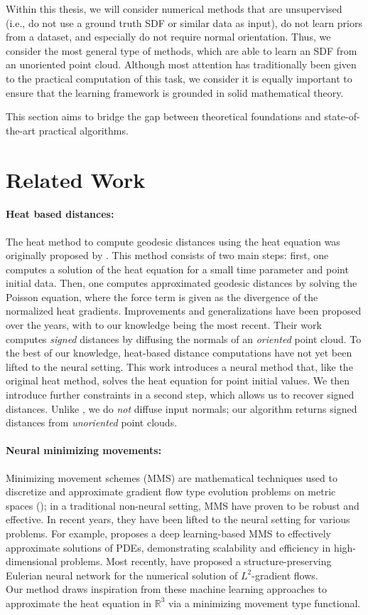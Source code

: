 \documentclass[12pt,openany]{book}
\newcommand{\R}{\mathbb{R}}
\theoremstyle{plainnormal}
\theoremstyle{remark}
\begin{document}
Within this thesis, we will consider numerical methods that are unsupervised (i.e., do not use a ground truth SDF or similar data as input), do not learn priors from a dataset, and especially do not require normal orientation. Thus, we consider the most general type of methods, which are able to learn an SDF from an unoriented point cloud. Although most attention has traditionally been given to the practical computation of this task, we consider it is equally important to ensure that the learning framework is grounded in solid mathematical theory. \par
This section aims to bridge the gap between theoretical foundations and state-of-the-art practical algorithms.
\section{Related Work} \label{SDF_rel_work}
\paragraph{Heat based distances:}
The heat method to compute geodesic distances using the heat equation was originally proposed by \cite{Crane_2013, Crane:2017:HMD}. This method consists of two main steps: first, one computes a solution of the heat equation for a small time parameter and point initial data. Then, one computes approximated geodesic distances by solving the Poisson equation, where the force term is given as the divergence of the normalized heat gradients. Improvements and generalizations have been proposed over the years, with \cite{FengCrane} to our knowledge being the most recent. Their work computes \emph{signed} distances by diffusing the normals of an \emph{oriented} point cloud. To the best of our knowledge, heat-based distance computations have not yet been lifted to the neural setting. This work introduces a neural method that, like the original heat method, solves the heat equation for point initial values. We then introduce further constraints in a second step, which allows us to recover signed distances. Unlike \cite{FengCrane}, we do \emph{not} diffuse input normals; our algorithm returns signed distances from \emph{unoriented} point clouds.
\paragraph{Neural minimizing movements:}
Minimizing movement schemes (MMS) are mathematical techniques used to discretize and approximate gradient flow type evolution problems on metric spaces (\cite{de1993new}); in a traditional non-neural setting, MMS have proven to be robust and effective. In recent years, they have been lifted to the neural setting for various problems. For example, \cite{park2023deep} proposes a deep learning-based MMS to effectively approximate solutions of PDEs, demonstrating scalability and efficiency in high-dimensional problems. Most recently, \cite{hu2024energetic} have proposed a structure-preserving Eulerian neural network for the numerical solution of $L^2$-gradient flows.\\
Our method draws inspiration from these machine learning approaches to approximate the heat equation in $\R^3$ via a minimizing movement type functional.
\end{document}
